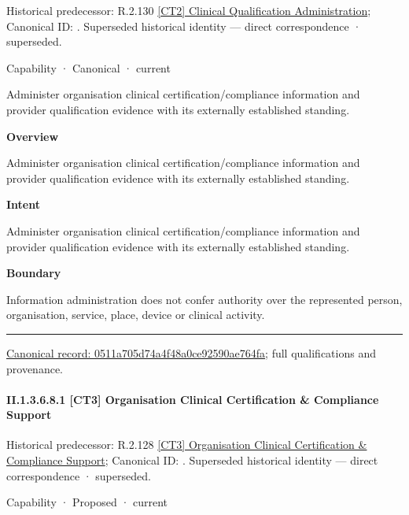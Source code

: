 {\small Historical predecessor: R.2.130 \hyperref[element:5fea7aaac4384245b1f08a3d8a076bd9]{[CT2] Clinical Qualification Administration}; Canonical ID: \texttt{}. Superseded historical identity — direct correspondence · superseded.}\par
\label{element:0511a705d74a4f48a0ce92590ae764fa}
{\small Capability · Canonical · current}\par

Administer organisation clinical certification/compliance information and provider qualification evidence with its externally established standing.



\textbf{Overview}



Administer organisation clinical certification/compliance information and provider qualification evidence with its externally established standing.



\textbf{Intent}



Administer organisation clinical certification/compliance information and provider qualification evidence with its externally established standing.



\textbf{Boundary}



Information administration does not confer authority over the represented person, organisation, service, place, device or clinical activity.



\medskip\hrule\medskip

{\footnotesize \href{../../../../../../../continuum/strategy/capability/0511a705d74a4f48a0ce92590ae764fa.md}{Canonical record: 0511a705d74a4f48a0ce92590ae764fa}; full qualifications and provenance.}\par
\paragraph*{II.1.3.6.8.1 [CT3] Organisation Clinical Certification \& Compliance Support}
\label{navigation:II.1.3.6.8.1}

{\small Historical predecessor: R.2.128 \hyperref[element:cee76a930a4e4e7d9c49357ba290c8bf]{[CT3] Organisation Clinical Certification \& Compliance Support}; Canonical ID: \texttt{}. Superseded historical identity — direct correspondence · superseded.}\par
\label{element:4de624e7bf49472f91e3e5c734ee8725}
{\small Capability · Proposed · current}\par

